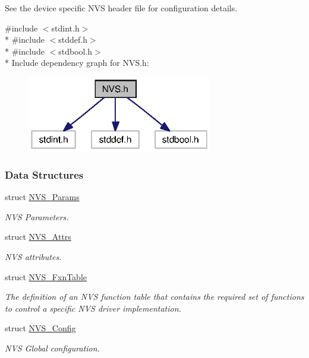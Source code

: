 See the device specific N\+V\+S header file for configuration details. 

{\ttfamily \#include $<$stdint.\+h$>$}\\*
{\ttfamily \#include $<$stddef.\+h$>$}\\*
{\ttfamily \#include $<$stdbool.\+h$>$}\\*
Include dependency graph for N\+V\+S.\+h\+:
\nopagebreak
\begin{figure}[H]
\begin{center}
\leavevmode
\includegraphics[width=229pt]{_n_v_s_8h__incl}
\end{center}
\end{figure}
\subsubsection*{Data Structures}
\begin{DoxyCompactItemize}
\item 
struct \hyperlink{struct_n_v_s___params}{N\+V\+S\+\_\+\+Params}
\begin{DoxyCompactList}\small\item\em N\+V\+S Parameters. \end{DoxyCompactList}\item 
struct \hyperlink{struct_n_v_s___attrs}{N\+V\+S\+\_\+\+Attrs}
\begin{DoxyCompactList}\small\item\em N\+V\+S attributes. \end{DoxyCompactList}\item 
struct \hyperlink{struct_n_v_s___fxn_table}{N\+V\+S\+\_\+\+Fxn\+Table}
\begin{DoxyCompactList}\small\item\em The definition of an N\+V\+S function table that contains the required set of functions to control a specific N\+V\+S driver implementation. \end{DoxyCompactList}\item 
struct \hyperlink{struct_n_v_s___config}{N\+V\+S\+\_\+\+Config}
\begin{DoxyCompactList}\small\item\em N\+V\+S Global configuration. \end{DoxyCompactList}\end{DoxyCompactItemize}
